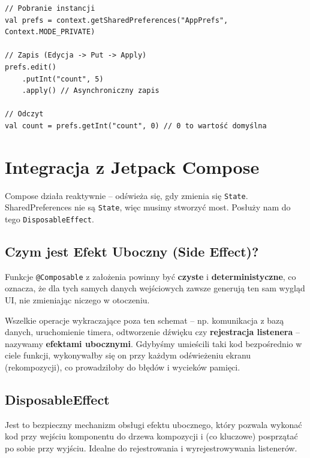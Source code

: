 \begin{verbatim}
// Pobranie instancji
val prefs = context.getSharedPreferences("AppPrefs", Context.MODE_PRIVATE)

// Zapis (Edycja -> Put -> Apply)
prefs.edit()
    .putInt("count", 5)
    .apply() // Asynchroniczny zapis

// Odczyt
val count = prefs.getInt("count", 0) // 0 to wartość domyślna
\end{verbatim}

\section{Integracja z Jetpack Compose}

Compose działa reaktywnie – odświeża się, gdy zmienia się \texttt{State}. SharedPreferences nie są \texttt{State}, więc musimy stworzyć most. Posłuży nam do tego \texttt{DisposableEffect}.

\subsection{Czym jest Efekt Uboczny (Side Effect)?}
Funkcje \texttt{@Composable} z założenia powinny być \textbf{czyste} i \textbf{deterministyczne}, co oznacza, że dla tych samych danych wejściowych zawsze generują ten sam wygląd UI, nie zmieniając niczego w otoczeniu.

Wszelkie operacje wykraczające poza ten schemat – np. komunikacja z bazą danych, uruchomienie timera, odtworzenie dźwięku czy \textbf{rejestracja listenera} – nazywamy \textbf{efektami ubocznymi}. Gdybyśmy umieścili taki kod bezpośrednio w ciele funkcji, wykonywałby się on przy każdym odświeżeniu ekranu (rekompozycji), co prowadziłoby do błędów i wycieków pamięci.

\subsection{DisposableEffect}
Jest to bezpieczny mechanizm obsługi efektu ubocznego, który pozwala wykonać kod przy wejściu komponentu do drzewa kompozycji i (co kluczowe) posprzątać po sobie przy wyjściu. Idealne do rejestrowania i wyrejestrowywania listenerów.

